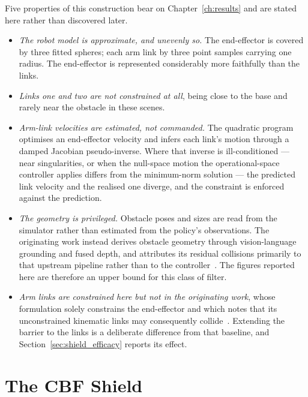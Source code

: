 \documentclass[a4paper,11pt]{report}
\begin{document}
Five properties of this construction bear on Chapter~\ref{ch:results} and are stated here rather
than discovered later.

\begin{itemize}
  \item \emph{The robot model is approximate, and unevenly so.} The end-effector is covered by
  three fitted spheres; each arm link by three point samples carrying one radius. The end-effector
  is represented considerably more faithfully than the links.

  \item \emph{Links one and two are not constrained at all}, being close to the base and rarely
  near the obstacle in these scenes.

  \item \emph{Arm-link velocities are estimated, not commanded.} The quadratic program optimises an
  end-effector velocity and infers each link's motion through a damped Jacobian pseudo-inverse.
  Where that inverse is ill-conditioned --- near singularities, or when the null-space motion the
  operational-space controller applies differs from the minimum-norm solution --- the predicted
  link velocity and the realised one diverge, and the constraint is enforced against the
  prediction.

  \item \emph{The geometry is privileged.} Obstacle poses and sizes are read from the simulator
  rather than estimated from the policy's observations. The originating work instead derives
  obstacle geometry through vision-language grounding and fused depth, and attributes its residual
  collisions primarily to that upstream pipeline rather than to the controller~\cite{vlsa2026}. The
  figures reported here are therefore an upper bound for this class of filter.

  \item \emph{Arm links are constrained here but not in the originating work}, whose formulation
  solely constrains the end-effector and which notes that its unconstrained kinematic links may
  consequently collide~\cite{vlsa2026}. Extending the barrier to the links is a deliberate
  difference from that baseline, and Section~\ref{sec:shield_efficacy} reports its effect.
\end{itemize}

\section{The CBF Shield}\label{sec:shield}
\end{document}
